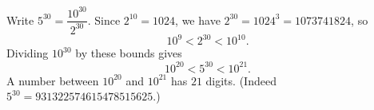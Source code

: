 Write $5^{30}=\dfrac{10^{30}}{2^{30}}$. Since $2^{10}=1024$, we have $2^{30}=1024^3=1073741824$, so
\[10^9<2^{30}<10^{10}.\]
Dividing $10^{30}$ by these bounds gives
\[10^{20}<5^{30}<10^{21}.\]
A number between $10^{20}$ and $10^{21}$ has $\boxed{21}$ digits. (Indeed $5^{30}=931322574615478515625$.)
